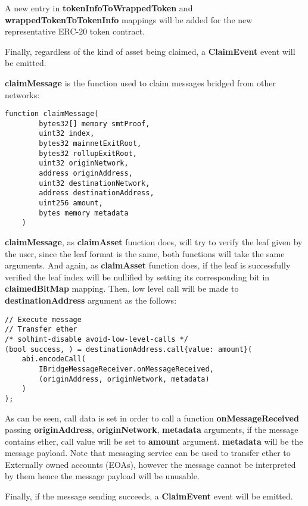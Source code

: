 A new entry in \textbf{tokenInfoToWrappedToken} and \textbf{wrappedTokenToTokenInfo} mappings will be added for the new representative ERC-20 token contract.

	
Finally, regardless of the kind of asset being claimed, a \textbf{ClaimEvent} event will be emitted.

\vspace{0.5cm}
	
\textbf{claimMessage} is the function used to claim messages bridged from other networks:
	
	
\begin{lstlisting}[language=solidity]
	function claimMessage(
        bytes32[] memory smtProof,
        uint32 index,
        bytes32 mainnetExitRoot,
        bytes32 rollupExitRoot,
        uint32 originNetwork,
        address originAddress,
        uint32 destinationNetwork,
        address destinationAddress,
        uint256 amount,
        bytes memory metadata
    )
\end{lstlisting}


\textbf {claimMessage}, as \textbf{claimAsset} function does, will try to verify the leaf given by the user, since the leaf format is the same, both functions will take the same arguments. And again, as \textbf{claimAsset} function does, if the leaf is successfully verified the leaf index will be nullified by setting its corresponding bit in \textbf{claimedBitMap} mapping.
Then, low level call will be made to \textbf{destinationAddress} argument as the follows:

\begin{lstlisting}[language=Solidity]
// Execute message
// Transfer ether
/* solhint-disable avoid-low-level-calls */
(bool success, ) = destinationAddress.call{value: amount}(
	abi.encodeCall(
		IBridgeMessageReceiver.onMessageReceived,
		(originAddress, originNetwork, metadata)
	)
);
\end{lstlisting}

As can be seen, call data is set in order to call a function \textbf{onMessageReceived} passing \textbf{originAddress}, \textbf{originNetwork}, \textbf{metadata} arguments, if the message contains  ether, call value will be set to \textbf{amount} argument. \textbf{metadata} will be the message payload. Note that messaging service can be used to transfer ether to Externally owned accounts (EOAs), however the message cannot be interpreted by them hence the message payload will be unusable.

Finally, if the message sending succeeds, a \textbf{ClaimEvent} event will be emitted.


